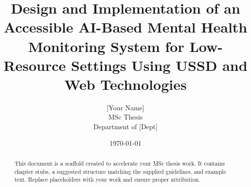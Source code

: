 \documentclass[12pt,a4paper]{report}
\title{Design and Implementation of an Accessible AI-Based Mental Health Monitoring System for Low-Resource Settings Using USSD and Web Technologies}
\author{[Your Name] \\ MSc Thesis \\ Department of [Dept] \\ [University Name]}
\date{\today}
\begin{document}
\maketitle
\begin{abstract}
\noindent This document is a scaffold created to accelerate your MSc thesis work. It contains chapter stubs, a suggested structure matching the supplied guidelines, and example text. Replace placeholders with your work and ensure proper attribution.
\end{abstract}

\tableofcontents
\listoffigures
\listoftables
\newpage
{}








\printbibliography

\appendix

\end{document}
